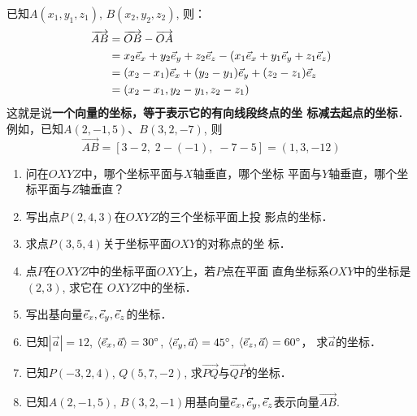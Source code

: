 \begin{figure}[htp]
    \centering
{}
    \caption{}
\end{figure}

已知$A(x_1,y_1,z_1)$, $B(x_2,y_2,z_2)$, 则：
\[\begin{split}
   \overrightarrow{AB}&=\overrightarrow{OB}-\overrightarrow{OA}\\
&=x_2\vec{e}_x+y_2\vec{e}_y+z_2\vec{e}_z-(x_1\vec{e}_x+y_1\vec{e}_y+z_1\vec{e}_z)\\
&=(x_2-x_1)\vec{e}_x+(y_2-y_1)\vec{e}_y+(z_2-z_1)\vec{e}_z\\
&=(x_2-x_1, y_2-y_1, z_2-z_1)
\end{split}\]
这就是说\textbf{一个向量的坐标，等于表示它的有向线段终点的坐
标减去起点的坐标}．例如，已知$A(2,-1,5)$、$B(3,
2,-7)$, 则
\[\Vec{AB}=[3-2,\; 2-(-1),\; -7-5]=(1,3,-12)\]

\begin{ex}
\begin{enumerate}
    \item 问在$OXYZ$中，哪个坐标平面与$X$轴垂直，哪个坐标
    平面与$Y$轴垂直，哪个坐标平面与$Z$轴垂直？
    \item 写出点$P(2,4,3)$在$OXYZ$的三个坐标平面上投
    影点的坐标．
    \item 求点$P(3,5,4)$关于坐标平面$OXY$的对称点的坐
    标．
    \item 点$P$在$OXYZ$中的坐标平面$OXY$上，若$P$点在平面
    直角坐标系$OXY$中的坐标是$(2,3)$, 求它在
    $OXYZ$中的坐标．
    \item 写出基向量$\vec{e}_x,\vec{e}_y,\vec{e}_z$的坐标．
    \item 已知$|\vec{a}|=12$, $\langle\vec{e}_x ,\vec{a}\rangle=30^{\circ}$, $\langle\vec{e}_y ,\vec{a}\rangle=45^{\circ}$, $\langle\vec{e}_z ,\vec{a}\rangle=60^{\circ}$，
求$\vec{a}$的坐标．
    \item 已知$P(-3,2,4)$, $Q(5,7,-2)$, 求$\Vec{PQ}$与$\Vec{QP}$的坐标．
    \item 已知$A(2,-1,5)$, $B(3,2,-1)$用基向量$\vec{e}_x,\vec{e}_y,\vec{e}_z$表示向量$\Vec{AB}$.
\end{enumerate}
\end{ex}

